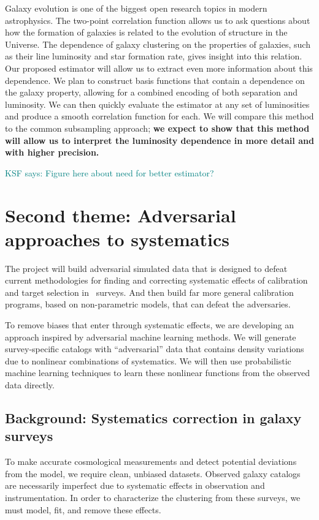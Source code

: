 \documentclass[12pt, fullpage, letterpaper]{article}
\newcommand{\KSF}[1]{\textcolor{teal}{KSF says: #1}}
\begin{document}
Galaxy evolution is one of the biggest open research topics in modern astrophysics.
The two-point correlation function allows us to ask questions about how the formation of galaxies is related to the evolution of structure in the Universe.
The dependence of galaxy clustering on the properties of galaxies, such as their line luminosity and star formation rate, gives insight into this relation.
Our proposed estimator will allow us to extract even more information about this dependence. 
We plan to construct basis functions that contain a dependence on the galaxy property, allowing for a combined encoding of both separation and luminosity. 
We can then quickly evaluate the estimator at any set of luminosities and produce a smooth correlation function for each. 
We will compare this method to the common subsampling approach; \textbf{we expect to show that this method will allow us to interpret the luminosity dependence in more detail and with higher precision.}

\KSF{Figure here about need for better estimator?}

\section{Second theme: Adversarial approaches to systematics}

The project will build adversarial simulated data that is
designed to defeat current methodologies for finding and correcting
systematic effects of calibration and target selection in \LSS\ 
surveys. And then build far more general calibration
programs, based on non-parametric models, that can defeat the
adversaries.

To remove biases that enter through systematic effects, we are developing an approach inspired by adversarial machine learning methods. 
We will generate survey-specific catalogs with ``adversarial'' data that contains density variations due to nonlinear combinations of systematics.
We will then use probabilistic machine learning techniques to learn these nonlinear functions from the observed data directly.

\subsection{Background: Systematics correction in galaxy surveys}

To make accurate cosmological measurements and detect potential deviations from the model, we require clean, unbiased datasets.
Observed galaxy catalogs are necessarily imperfect due to systematic effects in observation and instrumentation. 
In order to characterize the clustering from these surveys, we must model, fit, and remove these effects.
\end{document}
